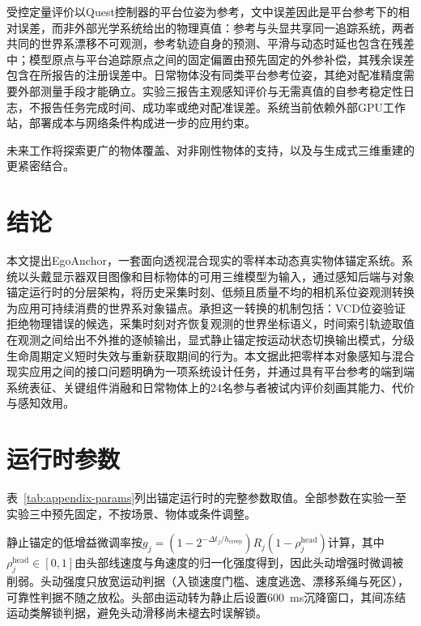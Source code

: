 \documentclass[review]{vgtc}
\begin{document}
受控定量评价以Quest控制器的平台位姿为参考，文中误差因此是平台参考下的相对误差，而非外部光学系统给出的物理真值：参考与头显共享同一追踪系统，两者共同的世界系漂移不可观测，参考轨迹自身的预测、平滑与动态时延也包含在残差中；模型原点与平台追踪原点之间的固定偏置由预先固定的外参补偿，其残余误差包含在所报告的注册误差中。日常物体没有同类平台参考位姿，其绝对配准精度需要外部测量手段才能确立。实验三报告主观感知评价与无需真值的自参考稳定性日志，不报告任务完成时间、成功率或绝对配准误差。系统当前依赖外部GPU工作站，部署成本与网络条件构成进一步的应用约束。

未来工作将探索更广的物体覆盖、对非刚性物体的支持，以及与生成式三维重建的更紧密结合。

\section{结论}\label{sec:conclusion}

本文提出EgoAnchor，一套面向透视混合现实的零样本动态真实物体锚定系统。系统以头戴显示器双目图像和目标物体的可用三维模型为输入，通过感知后端与对象锚定运行时的分层架构，将历史采集时刻、低频且质量不均的相机系位姿观测转换为应用可持续消费的世界系对象锚点。承担这一转换的机制包括：VCD位姿验证拒绝物理错误的候选，采集时刻对齐恢复观测的世界坐标语义，时间索引轨迹取值在观测之间给出不外推的逐帧输出，显式静止锚定按运动状态切换输出模式，分级生命周期定义短时失效与重新获取期间的行为。本文据此把零样本对象感知与混合现实应用之间的接口问题明确为一项系统设计任务，并通过具有平台参考的端到端系统表征、关键组件消融和日常物体上的24名参与者被试内评价刻画其能力、代价与感知效用。

\raggedbottom




\clearpage
\appendix

\section{运行时参数}\label{sec:appendix}

表~\ref{tab:appendix-params}列出锚定运行时的完整参数取值。全部参数在实验一至实验三中预先固定，不按场景、物体或条件调整。

静止锚定的低增益微调率按$g_j = (1 - 2^{-\Delta t_j / h_{\mathrm{creep}}}) R_j (1 - \rho_j^{\mathrm{head}})$计算，其中$\rho_j^{\mathrm{head}} \in [0,1]$由头部线速度与角速度的归一化强度得到，因此头动增强时微调被削弱。头动强度只放宽运动判据（入锁速度门槛、速度逃逸、漂移系绳与死区），可靠性判据不随之放松。头部由运动转为静止后设置600~ms沉降窗口，其间冻结运动类解锁判据，避免头动滑移尚未褪去时误解锁。
\end{document}
